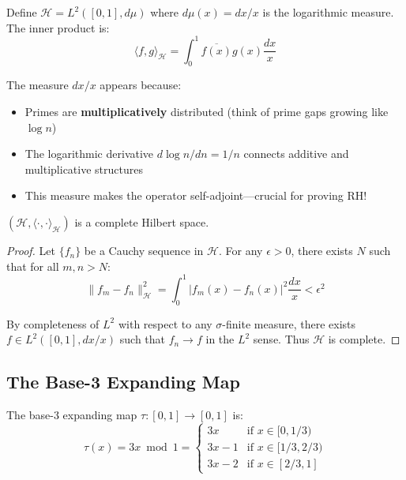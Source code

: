 \begin{defn}\label{def:log-hilbert-space}
Define $\mathcal{H} = L^2([0,1], d\mu)$ where $d\mu(x) = dx/x$ is the logarithmic measure. The inner product is:
\begin{equation}
\langle f, g \rangle_{\mathcal{H}} = \int_0^1 \overline{f(x)} g(x) \frac{dx}{x}
\end{equation}
\end{defn}

\begin{intuitive}
The measure $dx/x$ appears because:
\begin{itemize}
\item Primes are \textbf{multiplicatively} distributed (think of prime gaps growing like $\log n$)
\item The logarithmic derivative $d\log n / dn = 1/n$ connects additive and multiplicative structures
\item This measure makes the operator self-adjoint—crucial for proving RH!
\end{itemize}
\end{intuitive}

\begin{proposition}[Completeness]\label{prop:hilbert-completeness}
$(\mathcal{H}, \langle \cdot, \cdot \rangle_{\mathcal{H}})$ is a complete Hilbert space.
\end{proposition}

\begin{proof}
Let $\{f_n\}$ be a Cauchy sequence in $\mathcal{H}$. For any $\epsilon > 0$, there exists $N$ such that for all $m, n > N$:
\begin{equation}
\|f_m - f_n\|_{\mathcal{H}}^2 = \int_0^1 |f_m(x) - f_n(x)|^2 \frac{dx}{x} < \epsilon^2
\end{equation}

By completeness of $L^2$ with respect to any $\sigma$-finite measure, there exists $f \in L^2([0,1], dx/x)$ such that $f_n \to f$ in the $L^2$ sense. Thus $\mathcal{H}$ is complete.
\end{proof}

\subsection{The Base-3 Expanding Map}

\begin{defn}\label{def:base3-map}
The base-3 expanding map $\tau: [0,1] \to [0,1]$ is:
\begin{equation}
\tau(x) = 3x \bmod 1 = \begin{cases}
3x & \text{if } x \in [0, 1/3) \\
3x - 1 & \text{if } x \in [1/3, 2/3) \\
3x - 2 & \text{if } x \in [2/3, 1]
\end{cases}
\end{equation}
\end{defn}


